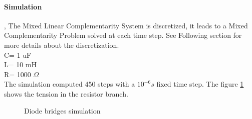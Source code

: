 \paragraph{Simulation}, The Mixed Linear Complementarity System is discretized, it leads to a Mixed
Complementarity Problem solved at each time step. See Following
section for more details about the discretization. \\
C= 1 uF\\
L= 10 mH\\
R= 1000 $\Omega$\\
The simulation computed 450 steps with a $10^{-6}s$ fixed time step. The figure
\ref{fig-Diode-sim} shows the tension in the resistor branch.


\begin {figure}[h]

\caption{Diode bridges simulation}
\label{fig-Diode-sim}
\end {figure} 
